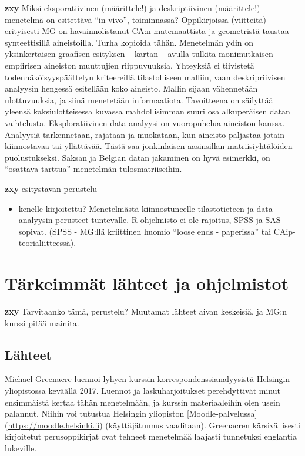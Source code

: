 \documentclass[finnish,]{book}
\providecommand{\tightlist}{%
  \setlength{\itemsep}{0pt}\setlength{\parskip}{0pt}}
\theoremstyle{definition}
\theoremstyle{definition}
\theoremstyle{definition}
\theoremstyle{remark}
\begin{document}
\textbf{zxy} Miksi eksporatiivinen (määrittele!) ja deskriptiivinen
(määrittele!) menetelmä on esitettävä ``in vivo'', toiminnassa?
Oppikirjoissa (viitteitä) erityisesti MG on havainnolistanut CA:n
matemaattista ja geometristä taustaa synteettisillä aineistoilla. Turha
kopioida tähän. Menetelmän ydin on yksinkertaisen graafisen esityksen --
kartan -- avulla tulkita monimutkaisen empiirisen aineiston muuttujien
riippuvuuksia. Yhteyksiä ei tiivistetä todennäköisyyspäättelyn
kriteereillä tilastolliseen malliin, vaan deskripriivisen analyysin
hengessä esitellään koko aineisto. Mallin sijaan vähennetään
ulottuvuuksia, ja siinä menetetään informaatiota. Tavoitteena on
säilyttää yleensä kaksiulotteisessa kuvassa mahdollisimman suuri osa
alkuperäisen datan vaihtelusta. Eksploratiivinen data-analyysi on
vuoropuhelua aineiston kanssa. Analyysiä tarkennetaan, rajataan ja
muokataan, kun aineisto paljastaa jotain kiinnostavaa tai yllättävää.
Tästä saa jonkinlaisen aasinsillan matriisiyhtälöiden puolustukseksi.
Saksan ja Belgian datan jakaminen on hyvä esimerkki, on ``osattava
tarttua'' menetelmän tulosmatriiseihin.

\textbf{zxy} esitystavan perustelu

\begin{itemize}
\tightlist
\item
  kenelle kirjoitettu? Menetelmästä kiinnostuneelle tilastotieteen ja
  data-analyysin perusteet tuntevalle. R-ohjelmisto ei ole rajoitus,
  SPSS ja SAS sopivat. (SPSS - MG:llä kriittinen huomio ``loose ends -
  paperissa'' tai CAip-teorialiitteessä).
\end{itemize}

\hypertarget{tarkeimmat-lahteet-ja-ohjelmistot}{%
\section{Tärkeimmät lähteet ja
ohjelmistot}\label{tarkeimmat-lahteet-ja-ohjelmistot}}

\textbf{zxy} Tarvitaanko tämä, perustelu? Muutamat lähteet aivan
keskeisiä, ja MG:n kurssi pitää mainita.

\hypertarget{lahteet}{%
\subsection{Lähteet}\label{lahteet}}

Michael Greenacre luennoi lyhyen kurssin korrespondenssianalyysistä
Helsingin yliopistossa keväällä
2017\citep{RefWorks:doc:5b6ef091e4b0984fd9b8c0ca}. Luennot ja
laskuharjoitukset perehdyttivät minut ensimmäistä kertaa tähän
menetelmään, ja kurssin materiaaleihin olen usein palannut. Niihin voi
tutustua Helsingin yliopiston {[}Moodle-palvelussa{]}
(\url{https://moodle.helsinki.fi}) (käyttäjätunnus vaaditaan).
Greenacren kärsivällisesti kirjoitetut perusoppikirjat ovat tehneet
menetelmää laajasti tunnetuksi englantia lukeville.
\end{document}
